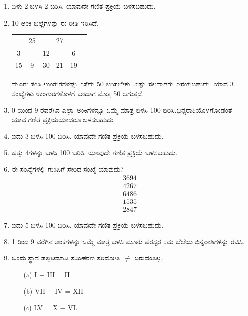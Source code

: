 \chapter[ಅಧ್ಯಾಯ 9]{}\label{chap9}

\begin{enumerate}
\renewcommand{\labelenumi}{\bf\theenumi.}
\itemsep=5pt

\item ಏಳು 2 ಬಳಸಿ 2 ಬರಿಸಿ. ಯಾವುದೇ ಗಣಿತ ಪ್ರಕ್ರಿಯೆ ಬಳಸಬಹುದು. 

\item 10 ಅಂಕಿ ಬಿಲ್ಲೆಗಳನ್ನು ಈ ರೀತಿ ಇರಿಸಿದೆ. 

\begin{tabular}[t]{c@{\;}c@{\;}c@{\;}c@{\;}c@{\;}c}
& 25 & & 27 & & \\
3 & & 12 & & 6 & \\
15 & 9 & 30 & 21 & 19
\end{tabular}

ಮೂರು ತಂತಿ ಉಂಗುರಗಳಷ್ಟು ಎಸೆದು 50 ಬರಿಸಬೇಕು. ಎಷ್ಟು ಸಲವಾದರು ಎಸೆಯಬಹುದು. ಯಾವ 3 ಸಂಖ್ಯೆಗಳು ಉಂಗುರಗಳೊಳಗೆ ಬಂದಾಗ ಮೊತ್ತ 50 ಆಗುತ್ತದೆ. 

\item 0 ಯಿಂದ 9 ರವರೆಗಿನ ಎಲ್ಲಾ ಅಂಕಿಗಳನ್ನೂ ಒಮ್ಮೆ ಮಾತ್ರ ಬಳಸಿ 100 ಬರಿಸಿ.\break ಭಿನ್ನರಾಶಿಯೊಳಗೊಂಡಂತೆ ಯಾವ ಗಣಿತ ಪ್ರಕ್ರಿಯೆಯಾದರೂ ಬಳಸಬಹುದು. 

\item ಐದು 3 ಬಳಸಿ 100 ಬರಿಸಿ. ಯಾವುದೇ ಗಣಿತ ಪ್ರಕ್ರಿಯೆ ಬಳಸಬಹುದು. 

\item ಹತ್ತು 4ಗಳನ್ನು ಬಳಸಿ 100 ಬರಿಸಿ. ಯಾವುದೇ ಗಣಿತ ಪ್ರಕ್ರಿಯೆ ಬಳಸಬಹುದು. 

\item ಈ ಸಂಖ್ಯೆಗಳಲ್ಲಿ ಗುಂಪಿಗೆ ಸೇರಿದ ಸಂಖ್ಯೆ ಯಾವುದು? 
\begin{gather*}
3694\\
4267\\
6486\\
1535\\
2847
\end{gather*}

\item ಐದು 5 ಬಳಸಿ 100 ಬರಿಸಿ. ಯಾವುದೇ ಗಣಿತ ಪ್ರಕ್ರಿಯೆ ಬಳಸಬಹುದು. 

\item 1 ರಿಂದ 9 ವರೆಗಿನ ಅಂಕಗಳನ್ನು ಒಮ್ಮೆ ಮಾತ್ರ ಬಳಸಿ ಮೂರು ಪರಸ್ಪರ ಸಮ ಬೆಲೆಯ ಭಿನ್ನರಾಶಿಗಳನ್ನು ರಚಿಸಿ. 

\item ಒಂದು ಸ್ಥಾನ ಪಲ್ಲಟಮಾಡಿ ಸಮೀಕರಣ ಸರಿದೂಗಿಸಿ $\neq$ ಬರುವಂತಿಲ್ಲ. 
\begin{itemize}
\item[(a)] I $-$ III = II
\item[(b)] VII $-$ IV = XII
\item[(c)] LV = X $-$ VL
\end{itemize}


\end{enumerate}
